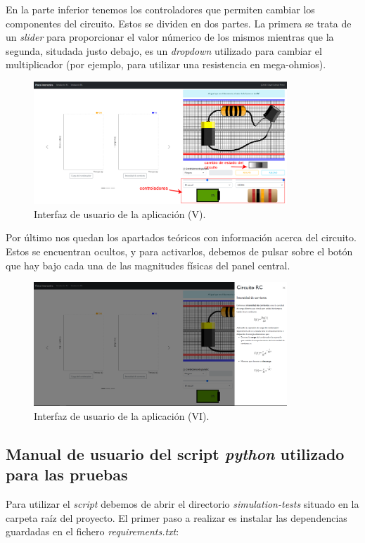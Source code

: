 \documentclass[../main.tex]{subfiles}
\begin{document}
En la parte inferior tenemos los controladores que permiten cambiar los componentes del circuito. Estos se dividen en dos partes. La primera se trata de un \textit{slider} para proporcionar el valor númerico de los mismos mientras que la segunda, situdada justo debajo, es un \textit{dropdown} utilizado para cambiar el multiplicador (por ejemplo, para utilizar una resistencia en mega-ohmios). \\ 

\begin{figure}[!ht]
  \centering
  \includegraphics[width=0.85\textwidth]{images/controladores.png}
  \caption{Interfaz de usuario de la aplicación (V).}
  \label{fig::interfaz-usuario5}
\end{figure}

Por último nos quedan los apartados teóricos con información acerca del circuito. Estos se encuentran ocultos, y para activarlos, debemos de pulsar sobre el botón que hay bajo cada una de las magnitudes físicas del panel central. 

\begin{figure}[!ht]
  \centering
  \includegraphics[width=0.85\textwidth]{images/teorico.png}
  \caption{Interfaz de usuario de la aplicación (VI).}
  \label{fig::interfaz-usuario6}
\end{figure}


\subsection{Manual de usuario del script \textit{python} utilizado para las pruebas}
Para utilizar el \textit{script} debemos de  abrir el directorio \textit{simulation-tests} situado en la carpeta raíz del proyecto. El primer paso a realizar es instalar las dependencias guardadas en el fichero \textit{requirements.txt}:
\end{document}
